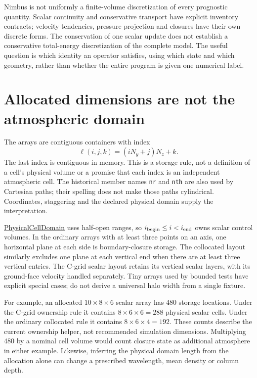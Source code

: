 Nimbus is not uniformly a finite-volume discretization of every prognostic
quantity. Scalar continuity and conservative transport have explicit inventory
contracts; velocity tendencies, pressure projection and closures have their own
discrete forms. The conservation of one scalar update does not establish a
conservative total-energy discretization of the complete model. The useful
question is which identity an operator satisfies, using which state and which
geometry, rather than whether the entire program is given one numerical label.

\section{Allocated dimensions are not the atmospheric domain}

The arrays are contiguous containers with index
\[
 \ell(i,j,k)=(iN_y+j)N_z+k.
\]
The last index is contiguous in memory. This is a storage rule, not a definition
of a cell's physical volume or a promise that each index is an independent
atmospheric cell. The historical member names \texttt{nr} and \texttt{nth}
are also used by Cartesian paths; their spelling does not make those paths
cylindrical. Coordinates, staggering and the declared physical domain supply
the interpretation.

\href{../include/core/infra/physical_cell_domain.hpp}{PhysicalCellDomain}
uses half-open ranges, so $i_{\rm begin}\le i<i_{\rm end}$ owns scalar
control volumes. In the ordinary arrays with at least three points on an axis,
one horizontal plane at each side is boundary-closure storage. The collocated
layout similarly excludes one plane at each vertical end when there are at
least three vertical entries. The C-grid scalar layout retains its vertical
scalar layers, with its ground-face velocity handled separately. Tiny arrays
used by bounded tests have explicit special cases; do not derive a universal
halo width from a single fixture.

For example, an allocated $10\times8\times6$ scalar array has 480 storage
locations. Under the C-grid ownership rule it contains $8\times6\times6=288$
physical scalar cells. Under the ordinary collocated rule it contains
$8\times6\times4=192$. These counts describe the current ownership helper,
not recommended simulation dimensions. Multiplying 480 by a nominal cell
volume would count closure state as additional atmosphere in either example.
Likewise, inferring the physical domain length from the allocation alone can
change a prescribed wavelength, mean density or column depth.

